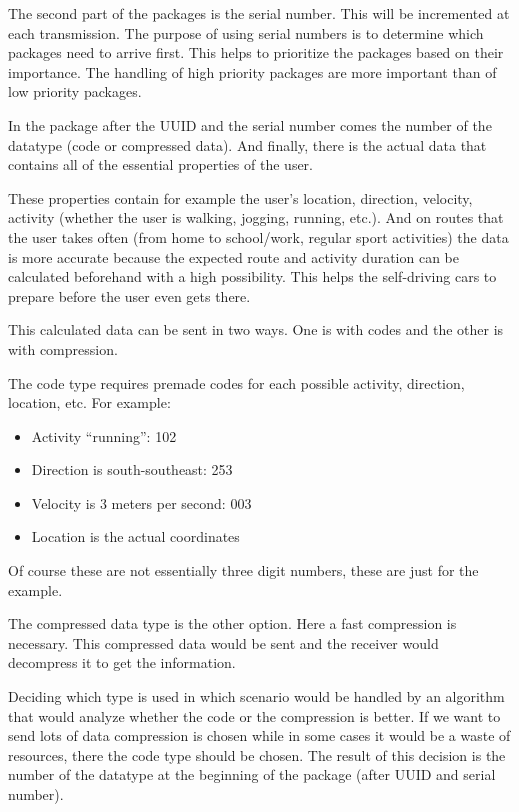 \documentclass[conference]{IEEEtran}
\begin{document}
The second part of the packages is the serial number. This will be incremented at each transmission. The purpose of using serial numbers is to determine which packages need to arrive first. This helps to prioritize the packages based on their importance. The handling of high priority packages are more important than of low priority packages.

In the package after the UUID and the serial number comes the number of the datatype (code or compressed data). And finally, there is the actual data that contains all of the essential properties of the user.

These properties contain for example the user’s location, direction, velocity, activity (whether the user is walking, jogging, running, etc.). And on routes that the user takes often (from home to school/work, regular sport activities) the data is more accurate because the expected route and activity duration can be calculated beforehand with a high possibility. This helps the self-driving cars to prepare before the user even gets there.

This calculated data can be sent in two ways. One is with codes and the other is with compression.

The code type requires premade codes for each possible activity, direction, location, etc.
For example:

\begin{itemize}
    \item Activity “running”: 102
    \item Direction is south-southeast: 253
    \item Velocity is 3 meters per second: 003
    \item Location is the actual coordinates
\end{itemize}

Of course these are not essentially three digit numbers, these are just for the example.

The compressed data type is the other option. Here a fast compression is necessary. This compressed data would be sent and the receiver would decompress it to get the information.

Deciding which type is used in which scenario would be handled by an algorithm that would analyze whether the code or the compression is better. If we want to send lots of data compression is chosen while in some cases it would be a waste of resources, there the code type should be chosen. The result of this decision is the number of the datatype at the beginning of the package (after UUID and serial number).
\end{document}
